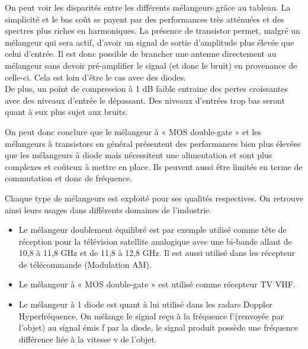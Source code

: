 \documentclass{article}
\begin{document}
On peut voir les disparités entre les différents mélangeurs grâce au tableau. La simplicité et le bas coût se payent par des performances très atténuées et des spectres plus riches en harmoniques. La présence de transistor permet, malgré un mélangeur qui sera actif, d'avoir un signal de sortie d'amplitude plus élevée que celui d'entrée. Il est donc possible de brancher une antenne directement au mélangeur sans devoir pré-amplifier le signal (et donc le bruit) en provenance de celle-ci. Cela est loin d'être le cas avec des diodes.\\
De plus, un point de compression à 1 dB faible entraine des pertes croissantes avec des niveaux d'entrée le dépassant. Des niveaux d'entrées trop bas seront quant à eux plus sujet aux bruits.

On peut donc conclure que le mélangeur à « MOS double-gate » et les mélangeurs à transistors en général présentent des performances bien plus élevées que les mélangeurs à diode mais nécessitent une alimentation et sont plus complexes et coûteux à mettre en place. Ils peuvent aussi être limités en terme de commutation et donc de fréquence.



Chaque type de mélangeurs est exploité pour ses qualités respectives. On retrouve ainsi leurs usages dans différents domaines de l'industrie.

\begin{itemize}
\item Le mélangeur doublement équilibré est par exemple utilisé comme tête de réception pour la télévision satellite analogique avec une bi-bande allant de 10,8 à 11,8 GHz et de 11,8 à 12,8 GHz.
Il est aussi utilisé dans les récepteur de télécommande (Modulation AM).
\item Le mélangeur à « MOS double-gate » est utilisé comme récepteur TV VHF.
\item Le mélangeur à 1 diode est quant à lui utilisé dans les radars Doppler Hyperfréquence. On mélange le signal reçu à la fréquence f’(renvoyée par l'objet) au signal émis f par la diode, le signal produit possède une fréquence différence liée à la vitesse v de l'objet. 
\end{itemize}
\end{document}
